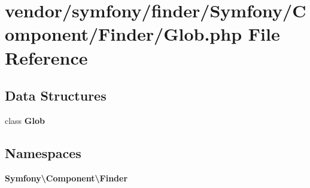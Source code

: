 \section{vendor/symfony/finder/\+Symfony/\+Component/\+Finder/\+Glob.php File Reference}
\label{_glob_8php}
\subsection*{Data Structures}
\begin{DoxyCompactItemize}
\item 
class {\bf Glob}
\end{DoxyCompactItemize}
\subsection*{Namespaces}
\begin{DoxyCompactItemize}
\item 
 {\bf Symfony\textbackslash{}\+Component\textbackslash{}\+Finder}
\end{DoxyCompactItemize}
